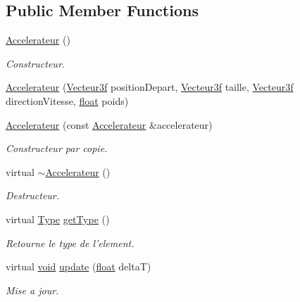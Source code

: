 \subsection*{Public Member Functions}
\begin{DoxyCompactItemize}
\item 
\hyperlink{group__inf2990_gaa9565cdb55e423b975ed39344f2c57a9}{Accelerateur} ()
\begin{DoxyCompactList}\small\item\em Constructeur. \end{DoxyCompactList}\item 
\hyperlink{group__inf2990_ga225372057b8bc81b0488af790df85fae}{Accelerateur} (\hyperlink{group__utilitaire_ga6b2956069f76c7e27df4f79f87e5a48c}{Vecteur3f} position\-Depart, \hyperlink{group__utilitaire_ga6b2956069f76c7e27df4f79f87e5a48c}{Vecteur3f} taille, \hyperlink{group__utilitaire_ga6b2956069f76c7e27df4f79f87e5a48c}{Vecteur3f} direction\-Vitesse, \hyperlink{fmod_8h_aeb841aa4b4b5f444b5d739d865b420af}{float} poids)
\item 
\hyperlink{group__inf2990_gac826e93cf1b9d277f38ca09d52636a43}{Accelerateur} (const \hyperlink{class_accelerateur}{Accelerateur} \&accelerateur)
\begin{DoxyCompactList}\small\item\em Constructeur par copie. \end{DoxyCompactList}\item 
virtual \hyperlink{group__inf2990_ga3e17016992773f130a44cd9f70249e85}{$\sim$\-Accelerateur} ()
\begin{DoxyCompactList}\small\item\em Destructeur. \end{DoxyCompactList}\item 
virtual \hyperlink{group___i_n_f2990-04_ga1d1cfd8ffb84e947f82999c682b666a7}{Type} \hyperlink{group__inf2990_ga2ee3174059cff90eda7941e20699f2c8}{get\-Type} ()
\begin{DoxyCompactList}\small\item\em Retourne le type de l'element. \end{DoxyCompactList}\item 
virtual \hyperlink{wglew_8h_aeea6e3dfae3acf232096f57d2d57f084}{void} \hyperlink{group__inf2990_ga5bfc1b71b8460b0d34667ab37e1881ff}{update} (\hyperlink{fmod_8h_aeb841aa4b4b5f444b5d739d865b420af}{float} delta\-T)
\begin{DoxyCompactList}\small\item\em Mise a jour. \end{DoxyCompactList}\item 

\end{DoxyCompactItemize}
